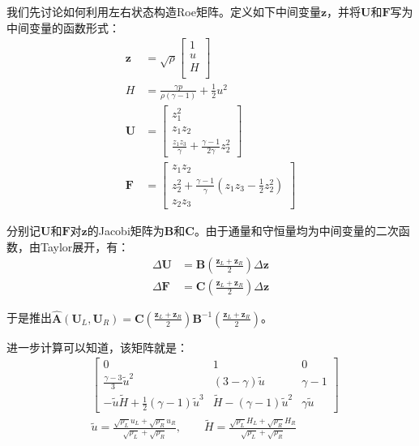 \documentclass[12pt, a4paper]{article}
\begin{document}
我们先讨论如何利用左右状态构造Roe矩阵。定义如下中间变量$\mathbf{z}$，并将$\mathbf{U}$和$\mathbf{F}$写为中间变量的函数形式：
\begin{align}
    \mathbf{z} &= \sqrt{\rho}
    \begin{bmatrix}
        1 \\
        u \\
        H \\
    \end{bmatrix} \\
    H &= \frac{\gamma p}{\rho (\gamma-1)} + \frac{1}{2}u^2 \\
    \mathbf{U} &= 
    \begin{bmatrix}
        z_1^2\\
        z_1z_2\\
        \frac{z_1z_3}{\gamma} + \frac{\gamma - 1}{2\gamma}z_2^2
    \end{bmatrix}\\
    \mathbf{F} &=
    \begin{bmatrix}
        z_1z_2\\
        z_2^2 + \frac{\gamma-1}{\gamma}(z_1z_3-\frac{1}{2}z_2^2)\\
        z_2z_3
    \end{bmatrix}
\end{align}

分别记$\mathbf{U}$和$\mathbf{F}$对$\mathbf{z}$的Jacobi矩阵为$\mathbf{B}$和$\mathbf{C}$。由于通量和守恒量均为中间变量的二次函数，由Taylor展开，有：
\begin{align}
    \Delta\mathbf{U}&=\mathbf{B}(\frac{\mathbf{z}_L+\mathbf{z}_R}{2})\Delta\mathbf{z}\\
    \Delta\mathbf{F}&=\mathbf{C}(\frac{\mathbf{z}_L+\mathbf{z}_R}{2})\Delta\mathbf{z}
\end{align}

于是推出$\widehat{\mathbf{A}}(\mathbf{U}_L, \mathbf{U}_R) = \mathbf{C}(\frac{\mathbf{z}_L+\mathbf{z}_R}{2})\mathbf{B}^{-1}(\frac{\mathbf{z}_L+\mathbf{z}_R}{2})$。

进一步计算可以知道，该矩阵就是：
\begin{align}
    &\begin{bmatrix}
        0&1&0\\
        \frac{\gamma-3}{3}\widetilde{u}^2&(3-\gamma)\widetilde{u}&\gamma-1\\
        -\widetilde{u}\widetilde{H}+\frac{1}{2}(\gamma-1)\widetilde{u}^3&\widetilde{H}-(\gamma-1)\widetilde{u}^2&\gamma\widetilde{u} 
    \end{bmatrix}\\
    &\widetilde{u} = \frac{\sqrt{\rho_L}u_L+\sqrt{\rho_R}u_R}{\sqrt{\rho_L}+\sqrt{\rho_R}},\qquad\widetilde{H} = \frac{\sqrt{\rho_L}H_L+\sqrt{\rho_R}H_R}{\sqrt{\rho_L}+\sqrt{\rho_R}}
\end{align}
\end{document}
